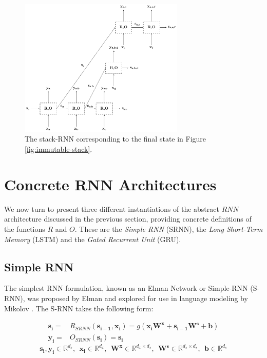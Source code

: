\documentclass[jair,twoside,11pt,theapa]{article}
\newcommand{\m}[1]{\mathbf{#1}}%
\renewcommand{\shortcite}[0]{\citeyear}
\begin{document}
{\begin{figure}[ht]
    \begin{center}
    \includegraphics[width=0.7\textwidth]{stack-rnn.pdf}
    \end{center}
    \caption{The stack-RNN corresponding to the final state in Figure
    \ref{fig:immutable-stack}.}
    \label{fig:stack-rnn}
\end{figure}


\clearpage
\section{Concrete RNN Architectures}
\label{sec:rnn-arch}

We now turn to present three different instantiations of the abstract $RNN$
architecture discussed in the previous section, providing concrete definitions
of the functions $R$ and $O$.  These are the \emph{Simple RNN} (SRNN), the
\emph{Long Short-Term Memory} (LSTM) and the \emph{Gated Recurrent Unit} (GRU). 

\subsection{Simple RNN} 

The simplest RNN formulation, known as an Elman Network or Simple-RNN (S-RNN),
was proposed by Elman \shortcite{elman1990finding} and explored for use in language
modeling by Mikolov \shortcite{mikolov2012statistical}.  The S-RNN takes the following form:

\begin{align*}
    \m{s_i} =& R_{SRNN}(\m{s_{i-1}}, \m{x_i} ) = g(\m{x_i}\m{W^x} + \m{s_{i-1}}\m{W^s} + \m{b}) \\
    \m{y_i} =& O_{SRNN}(\m{s_{i}})             = \m{s_{i}} 
\end{align*}
\[
\m{s_i}, \m{y_i} \in \mathbb{R}^{d_s}, \,\;
\m{x_i} \in \mathbb{R}^{d_x}, \,\;
\m{W^x} \in \mathbb{R}^{d_x \times d_s}, \,\;
\m{W^s} \in \mathbb{R}^{d_s \times d_s}, \,\;
\m{b}   \in \mathbb{R}^{d_s}
\]

}
\end{document}
